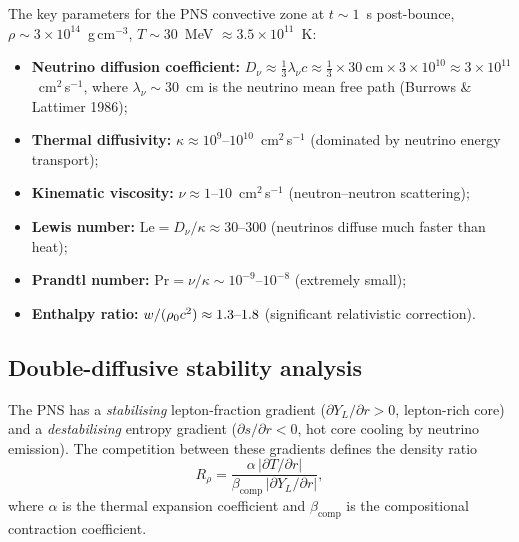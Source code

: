 The key parameters for the PNS convective zone at $t \sim 1$~s post-bounce,
$\rho \sim 3 \times 10^{14}$~g\,cm$^{-3}$, $T \sim 30$~MeV
$\approx 3.5 \times 10^{11}$~K:
\begin{itemize}
  \item \textbf{Neutrino diffusion coefficient:}
    $D_{\nu} \approx \frac{1}{3}\lambda_{\nu}c
    \approx \frac{1}{3} \times 30~\mathrm{cm} \times 3 \times 10^{10}
    \approx 3 \times 10^{11}$~cm$^{2}$\,s$^{-1}$,
    where $\lambda_{\nu} \sim 30$~cm is the neutrino mean free path
    (Burrows \& Lattimer 1986);
  \item \textbf{Thermal diffusivity:}
    $\kappa \approx 10^{9}\text{--}10^{10}$~cm$^{2}$\,s$^{-1}$
    (dominated by neutrino energy transport);
  \item \textbf{Kinematic viscosity:}
    $\nu \approx 1\text{--}10$~cm$^{2}$\,s$^{-1}$
    (neutron--neutron scattering);
  \item \textbf{Lewis number:}
    $\mathrm{Le} = D_{\nu}/\kappa \approx 30\text{--}300$
    (neutrinos diffuse much faster than heat);
  \item \textbf{Prandtl number:}
    $\mathrm{Pr} = \nu/\kappa \sim 10^{-9}\text{--}10^{-8}$
    (extremely small);
  \item \textbf{Enthalpy ratio:}
    $w/(\rho_0 c^{2}) \approx 1.3\text{--}1.8$
    (significant relativistic correction).
\end{itemize}

\subsection{Double-diffusive stability analysis}

The PNS has a \emph{stabilising} lepton-fraction gradient
($\partial Y_{L}/\partial r > 0$, lepton-rich core) and a
\emph{destabilising} entropy gradient ($\partial s/\partial r < 0$,
hot core cooling by neutrino emission).  The competition between these
gradients defines the density ratio
\begin{equation}\label{eq:rel-3-app-Rrho}
  R_{\rho}
  = \frac{\alpha\,|\partial T/\partial r|}
         {\beta_{\mathrm{comp}}\,|\partial Y_{L}/\partial r|},
\end{equation}
where $\alpha$ is the thermal expansion coefficient and
$\beta_{\mathrm{comp}}$ is the compositional contraction coefficient.

